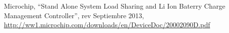 \begin{thebibliography}{99}
{ Microchip, ``Stand\- Alone System Load Sharing and Li\- Ion Baterry Charge Management Controller'', rev Septiembre 2013, \hyperref[temp]{http://ww1.microchip.com/downloads/en/DeviceDoc/20002090D.pdf}
}
%
%
\end{thebibliography}